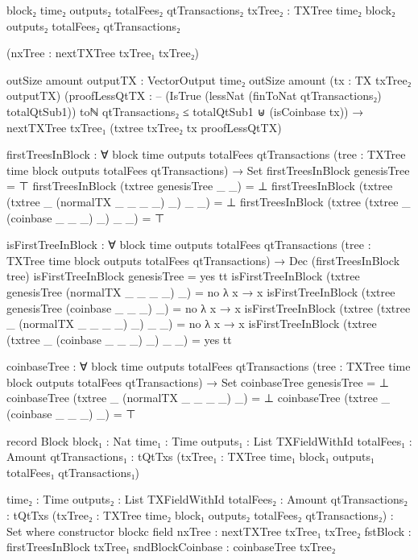 \documentclass{beamer}
\begin{document}
\begin{code}
        {block₂ time₂ outputs₂ totalFees₂ qtTransactions₂}
        {txTree₂ : TXTree time₂ block₂ outputs₂ totalFees₂ qtTransactions₂}

        (nxTree : nextTXTree txTree₁ txTree₂)

        {outSize amount}
        {outputTX : VectorOutput time₂ outSize amount}
        (tx : TX txTree₂ outputTX)
        (proofLessQtTX :
            -- (IsTrue (lessNat (finToNat qtTransactions₂) totalQtSub1))
            toℕ qtTransactions₂ ≤ totalQtSub1
            ⊎
            (isCoinbase tx))
        → nextTXTree txTree₁ (txtree txTree₂ tx proofLessQtTX)

    firstTreesInBlock : ∀
      {block time outputs totalFees qtTransactions}
      (tree : TXTree time block outputs totalFees qtTransactions)
      → Set
    firstTreesInBlock genesisTree = ⊤
    firstTreesInBlock (txtree genesisTree _ _) = ⊥
    firstTreesInBlock (txtree (txtree _ (normalTX _ _ _ _) _) _ _) = ⊥
    firstTreesInBlock (txtree (txtree _ (coinbase _ _ _) _) _ _) = ⊤

    isFirstTreeInBlock : ∀
      {block time outputs totalFees qtTransactions}
      (tree : TXTree time block outputs totalFees qtTransactions)
      → Dec (firstTreesInBlock tree)
    isFirstTreeInBlock genesisTree = yes tt
    isFirstTreeInBlock (txtree genesisTree (normalTX _ _ _ _) _) = no λ x → x
    isFirstTreeInBlock (txtree genesisTree (coinbase _ _ _) _) = no λ x → x
    isFirstTreeInBlock (txtree (txtree _ (normalTX _ _ _ _) _) _ _) = no λ x → x
    isFirstTreeInBlock (txtree (txtree _ (coinbase _ _ _) _) _ _) = yes tt

    coinbaseTree : ∀
      {block time outputs totalFees qtTransactions}
      (tree : TXTree time block outputs totalFees qtTransactions)
      → Set
    coinbaseTree genesisTree = ⊥
    coinbaseTree (txtree _ (normalTX _ _ _ _) _) = ⊥
    coinbaseTree (txtree _ (coinbase _ _ _) _) = ⊤

    record Block
      {block₁ : Nat}
      {time₁ : Time}
      {outputs₁ : List TXFieldWithId}
      {totalFees₁ : Amount}
      {qtTransactions₁ : tQtTxs}
      (txTree₁ : TXTree time₁ block₁ outputs₁ totalFees₁ qtTransactions₁)

      {time₂ : Time}
      {outputs₂ : List TXFieldWithId}
      {totalFees₂ : Amount}
      {qtTransactions₂ : tQtTxs}
      (txTree₂ : TXTree time₂ block₁ outputs₂ totalFees₂ qtTransactions₂)
      : Set where
      constructor blockc
      field
        nxTree           : nextTXTree txTree₁ txTree₂
        fstBlock         : firstTreesInBlock txTree₁
        sndBlockCoinbase : coinbaseTree txTree₂


\end{code}
\end{document}
